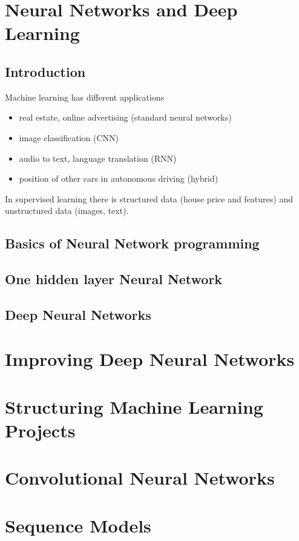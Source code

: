 \documentclass{article}
\begin{document}
\section{Neural Networks and Deep Learning}
\subsection{Introduction}
Machine learning has different applications
\begin{itemize}
\item real estate, online advertising (standard neural networks)
\item image classification (CNN)
\item audio to text, language translation (RNN)
\item position of other cars in autonomous driving (hybrid)
\end{itemize}

In supervised learning there is structured data (house price and features)
and unstructured data (images, text).

\subsection{Basics of Neural Network programming}
\subsection{One hidden layer Neural Network}
\subsection{Deep Neural Networks}

\section{Improving Deep Neural Networks}
\section{Structuring Machine Learning Projects}
\section{Convolutional Neural Networks}
\section{Sequence Models}
\end{document}
